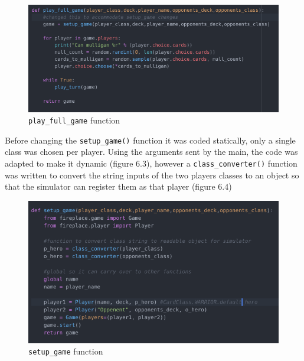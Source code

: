 \documentclass{report} %
\begin{document}
\begin{figure}[H]
\centering
\includegraphics[width=1.25\textwidth]{playFullGame}
\caption{\nolinkurl{play_full_game} function \protect}
 \label{board}
\end{figure}

Before changing the \nolinkurl{setup_game()} function it was coded statically, only a single class was chosen per player. Using the arguments sent by the main, the code was adapted to make it dynamic (figure 6.3), however a \nolinkurl{class_converter()} function was written to convert the string inputs of the two players classes to an object so that the simulator can register them as that player (figure 6.4)

\begin{figure}[H]
\centering
\includegraphics[width=1\textwidth]{setupGame}
\caption{\nolinkurl{setup_game} function \protect}
 \label{board}
\end{figure}
\end{document}
